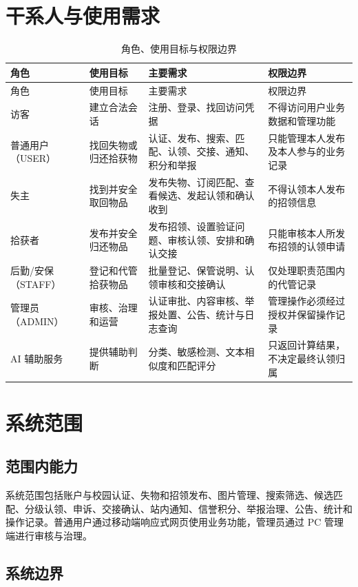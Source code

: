 \section{干系人与使用需求}

\begin{longtable}{L{2.4cm} L{3.2cm} L{5.0cm} L{3.6cm}}
  \caption{角色、使用目标与权限边界}\label{tab:roles}\\
  \toprule
  角色 & 使用目标 & 主要需求 & 权限边界 \\
  \midrule
  \endfirsthead
  \toprule
  角色 & 使用目标 & 主要需求 & 权限边界 \\
  \midrule
  \endhead
  访客 & 建立合法会话 & 注册、登录、找回访问凭据 & 不得访问用户业务数据和管理功能 \\
  普通用户（USER） & 找回失物或归还拾获物 & 认证、发布、搜索、匹配、认领、交接、通知、积分和举报 & 只能管理本人发布及本人参与的业务记录 \\
  失主 & 找到并安全取回物品 & 发布失物、订阅匹配、查看候选、发起认领和确认收到 & 不得认领本人发布的招领信息 \\
  拾获者 & 发布并安全归还物品 & 发布招领、设置验证问题、审核认领、安排和确认交接 & 只能审核本人所发布招领的认领申请 \\
  后勤/安保（STAFF） & 登记和代管拾获物品 & 批量登记、保管说明、认领审核和交接确认 & 仅处理职责范围内的代管记录 \\
  管理员（ADMIN） & 审核、治理和运营 & 认证审批、内容审核、举报处置、公告、统计与日志查询 & 管理操作必须经过授权并保留操作记录 \\
  AI 辅助服务 & 提供辅助判断 & 分类、敏感检测、文本相似度和匹配评分 & 只返回计算结果，不决定最终认领归属 \\
  \bottomrule
\end{longtable}

\section{系统范围}

\subsection{范围内能力}

系统范围包括账户与校园认证、失物和招领发布、图片管理、搜索筛选、候选匹配、分级认领、申诉、交接确认、站内通知、信誉积分、举报治理、公告、统计和操作记录。普通用户通过移动端响应式网页使用业务功能，管理员通过 PC 管理端进行审核与治理。

\subsection{系统边界}

